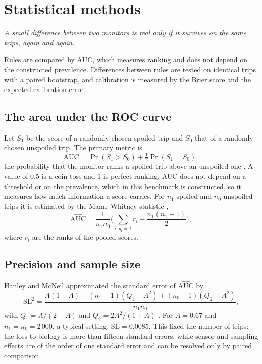 \documentclass[11pt,a4paper,twoside,openany]{book}
\newcommand{\hook}[1]{{\noindent\fontsize{14}{20}\selectfont\itshape\color{dggrey}#1\par}\vspace{14pt}}
\newcommand{\AUC}{\mathrm{AUC}}
\theoremstyle{plain}\newtheorem{proposition}{Proposition}\newtheorem{corollary}{Corollary}
\theoremstyle{definition}\newtheorem{definition}{Definition}[chapter]
\begin{document}
\chapter{Statistical methods}\label{ch:stats}
\hook{A small difference between two monitors is real only if it survives on the same trips, again and again.}
\begin{summary}
Rules are compared by AUC, which measures ranking and does not depend on the constructed prevalence. Differences between rules are tested on identical trips with a paired bootstrap, and calibration is measured by the Brier score and the expected calibration error.
\end{summary}
\section{The area under the ROC curve}
Let $S_1$ be the score of a randomly chosen spoiled trip and $S_0$ that of a randomly chosen unspoiled trip. The primary metric is
\begin{equation}\label{eq:aucdef}
\AUC=\Pr(S_1>S_0)+\tfrac12\Pr(S_1=S_0),
\end{equation}
the probability that the monitor ranks a spoiled trip above an unspoiled one \cite{hanley1982}. A value of 0.5 is a coin toss and 1 is perfect ranking. AUC does not depend on a threshold or on the prevalence, which in this benchmark is constructed, so it measures how much information a score carries. For $n_1$ spoiled and $n_0$ unspoiled trips it is estimated by the Mann--Whitney statistic \cite{mannwhitney1947},
\begin{equation}\label{eq:auc}
\widehat{\AUC}=\frac{1}{n_1n_0}\Big(\sum_{i:y_i=1}r_i-\frac{n_1(n_1+1)}{2}\Big),
\end{equation}
where $r_i$ are the ranks of the pooled scores.

\section{Precision and sample size}
Hanley and McNeil approximated the standard error of $\widehat{\AUC}$ by
\begin{equation}\label{eq:hm}
\mathrm{SE}^2=\frac{A(1-A)+(n_1-1)(Q_1-A^2)+(n_0-1)(Q_2-A^2)}{n_1n_0},
\end{equation}
with $Q_1=A/(2-A)$ and $Q_2=2A^2/(1+A)$ \cite{hanley1982}. For $A=0.67$ and $n_1=n_0=2\,000$, a typical setting, $\mathrm{SE}=0.0085$. This fixed the number of trips: the loss to biology is more than fifteen standard errors, while sensor and sampling effects are of the order of one standard error and can be resolved only by paired comparison.
\end{document}
